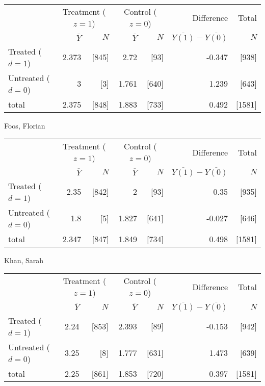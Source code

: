 \documentclass[11pt,notitlepage]{article}
\begin{document}
\begin{table}[h!]
\begin{center}
\begin{tabular}{l|rr|rr|rr}
  \hline
 & \multicolumn{2}{c|}{Treatment ($z=1$)} & \multicolumn{2}{c|}{Control ($z=0$)} & Difference & Total \\
 & $\overline{Y}$ & $N$ & $\overline{Y}$ & $N$ & $\overline{Y(1)} - \overline{Y(0)}$ & $N$ \\ 
  \hline
Treated ($d=1$) &  2.373 & [845] & 2.72 & [93] & -0.347 & [938] \\ 
  Untreated ($d=0$) & 3 & [3] & 1.761 & [640] & 1.239 & [643] \\ 
\hline
  total & 2.375 & [848] & 1.883 & [733] & 0.492 & [1581] \\ 
   \hline
\end{tabular}
\end{center}
\end{table}
Foos, Florian

\begin{table}[h!]
\begin{center}
\begin{tabular}{l|rr|rr|rr}
  \hline
 & \multicolumn{2}{c|}{Treatment ($z=1$)} & \multicolumn{2}{c|}{Control ($z=0$)} & Difference & Total \\
 & $\overline{Y}$ & $N$ & $\overline{Y}$ & $N$ & $\overline{Y(1)} - \overline{Y(0)}$ & $N$ \\ 
  \hline
Treated ($d=1$) &  2.35 & [842] & 2 & [93] & 0.35 & [935] \\ 
  Untreated ($d=0$) & 1.8 & [5] & 1.827 & [641] & -0.027 & [646] \\ 
  \hline
  total & 2.347 & [847] & 1.849 & [734] & 0.498 & [1581] \\ 
   \hline
\end{tabular}
\end{center}
\end{table}
Khan, Sarah

\begin{table}[h!]
\begin{center}
\begin{tabular}{l|rr|rr|rr}
  \hline
 & \multicolumn{2}{c|}{Treatment ($z=1$)} & \multicolumn{2}{c|}{Control ($z=0$)} & Difference & Total \\
 & $\overline{Y}$ & $N$ & $\overline{Y}$ & $N$ & $\overline{Y(1)} - \overline{Y(0)}$ & $N$ \\ 
  \hline
Treated ($d=1$) &  2.24 & [853] & 2.393 & [89] & -0.153 & [942] \\ 
  Untreated ($d=0$) & 3.25 & [8] & 1.777 & [631] & 1.473 & [639] \\ 
  \hline
  total & 2.25 & [861] & 1.853 & [720] & 0.397 & [1581] \\ 
   \hline
\end{tabular}
\end{center}
\end{table}
\end{document}
